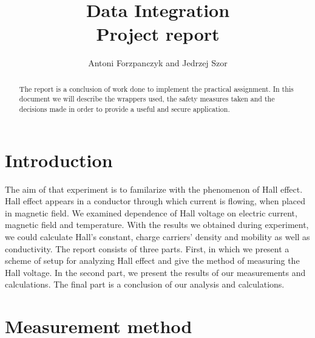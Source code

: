 \documentclass[a4paper,12pt]{article}
\begin{document}
	
\title{Data Integration\\Project report}
\author{Antoni Forzpanczyk and Jedrzej Szor}

\maketitle

\begin{abstract}
The report is a conclusion of work done to implement the practical assignment. In this document we will describe the wrappers used, the safety measures taken and the decisions made in order to provide a useful and secure application.
\end{abstract}

\section{Introduction}
The aim of that experiment is to familarize with the phenomenon of Hall effect. Hall effect appears in a conductor through which current is flowing, when placed in magnetic field. We examined dependence of Hall voltage on electric current, magnetic field and temperature. With the results we obtained during experiment, we could calculate Hall’s constant, charge carriers’ density and mobility as well as conductivity.
The report consists of three parts. First, in which we present a scheme of setup for analyzing Hall effect and give the method of measuring the Hall voltage. In the second part, we present the results of our measurements and calculations. The final part is a conclusion of our
analysis and calculations.

\newpage
\section{Measurement method}
\end{document}
